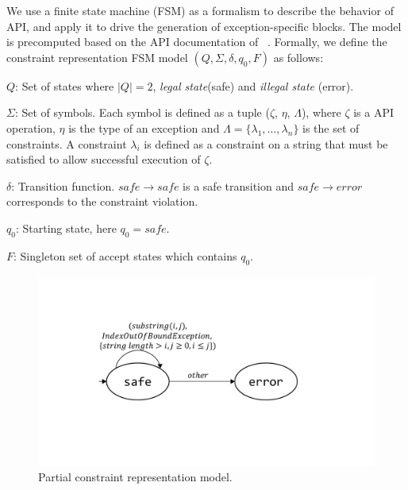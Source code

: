 
  We use a finite state
machine
(FSM) as a formalism to describe the behavior of \java\  API, and 
apply it to drive the generation of exception-specific  blocks. The
model is precomputed based on the API documentation of \java\ .
Formally, we define the constraint representation FSM model $(Q, \Sigma, \delta,
q_0, F)$ as follows:
\begin{mybullet}
 \item $Q$: Set of states where $|Q| = 2$, \emph{legal state}(safe) and
\emph{illegal state} (error).

 \item $\Sigma$: Set of symbols. Each symbol is defined as a tuple ($\zeta$,
$\eta$, $\Lambda$), where $\zeta$ is a  API operation, $\eta$ is
the type of an exception and $\Lambda = \{\lambda_1, \ldots, \lambda_n\}$  is
the set of constraints. A constraint $\lambda_i$ is defined as a constraint on
a string that must be satisfied to allow successful execution of $\zeta$.

 \item $\delta$: Transition function. $safe \rightarrow safe$ is a safe
transition and $safe \rightarrow error$ corresponds to the constraint violation.

 \item $q_0$: Starting state, here $q_0 = safe$.

 \item $F$: Singleton set of accept states which contains $q_0$.
\end{mybullet}

\begin{figure}[t]
\centering
\includegraphics[scale=.25]{images/automataString.pdf}
\caption{Partial constraint representation model.}
\label{fig:constraintautomata}
\end{figure}

